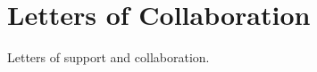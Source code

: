 \chapter{Letters of Collaboration}
\label{sec:collaboration}

\noindent
Letters of support and collaboration.

\minitoc

\newpage

